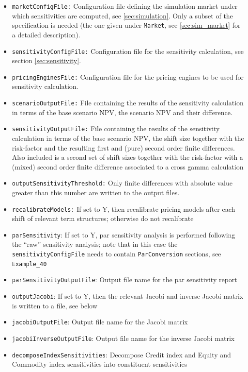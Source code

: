 \begin{itemize}
\item {\tt marketConfigFile:} Configuration file defining the simulation market under which sensitivities are computed,
  see \ref{sec:simulation}. Only a subset of the specification is needed (the one given under {\tt Market}, see
  \ref{sec:sim_market} for a detailed description).
\item {\tt sensitivityConfigFile:} Configuration file  for the sensitivity calculation, see section \ref{sec:sensitivity}.
\item {\tt pricingEnginesFile:} Configuration file for the pricing engines to be used for sensitivity calculation.
\item {\tt scenarioOutputFile:} File containing the results of the sensitivity calculation in terms of the base scenario
  NPV, the scenario NPV and their difference.
\item {\tt sensitivityOutputFile:} File containing the results of the sensitivity calculation in terms of the base scenario
  NPV, the shift size together with the risk-factor and the resulting first and (pure) second order finite differences.
  Also included is a second set of shift sizes together with the risk-factor with a (mixed) second order finite difference associated to a cross gamma calculation
\item {\tt outputSensitivityThreshold:} Only finite differences with absolute value greater than this number are written
  to the output files.
\item {\tt recalibrateModels:} If set to Y, then recalibrate pricing models after each shift of relevant term structures;
  otherwise do not recalibrate
\item {\tt parSensitivity}: If set to Y, par sensitivity analysis is performed following the ``raw'' sensitivity analysis;
  note that in this case the  {\tt sensitivityConfigFile} needs to contain {\tt ParConversion} sections, see {\tt Example\_40}
\item {\tt parSensitivityOutputFile}: Output file name for the par sensitivity report
\item {\tt outputJacobi}: If set to Y, then the relevant Jacobi and inverse Jacobi matrix is written to a file, see below
\item {\tt jacobiOutputFile}: Output file name for the Jacobi matrix
\item {\tt jacobiInverseOutputFile}: Output file name for the inverse Jacobi matrix
\item {\tt decomposeIndexSensitivities}: Decompose Credit index and Equity and Commodity index sensitivities into constituent sensitivities
\end{itemize}

